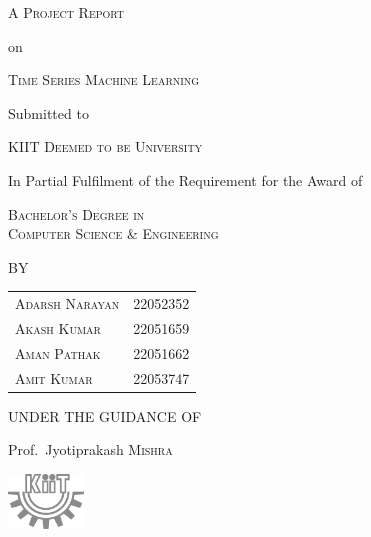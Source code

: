 \begin{titlepage}
	\centering
	\vfill %
	
	{\Large \textsc{A Project Report}\par}
	\vspace{0.5cm}
	{\normalsize on\par}
	\vspace{0.5cm}
	{\huge \textsc{Time Series Machine Learning}\par} %
	\vspace{1cm}
	{\normalsize Submitted to\par}
	\vspace{0.5cm}
	{\Large \textsc{KIIT Deemed to be University}\par}
	\vspace{1cm}
	{\normalsize In Partial Fulfilment of the Requirement for the Award of\par}
	\vspace{0.5cm}
	{\Large \textsc{Bachelor's Degree in \\ Computer Science \& Engineering}\par}
	\vspace{1cm}
	{\normalsize BY\par}
	\vspace{0.5cm}
	\begin{tabular}{ll}
		\textsc{Adarsh Narayan} & \textsc{22052352} \\
		\textsc{Akash Kumar}    & \textsc{22051659} \\
		\textsc{Aman Pathak}    & \textsc{22051662} \\
		\textsc{Amit Kumar}     & \textsc{22053747} \\
	\end{tabular}
	\par
	\vspace{0.5cm}
	{\normalsize UNDER THE GUIDANCE OF\par}
	\vspace{0.5cm}
	{\normalsize Prof.~Jyotiprakash \textsc{Mishra}\par}
	
	\vfill %
	
	\includegraphics[width=0.15\textwidth]{./assets/bw_kiit.png}\par %
\end{titlepage}

